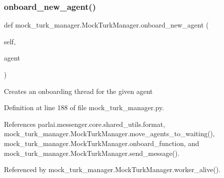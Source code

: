 \mbox{\label{classmock__turk__manager_1_1MockTurkManager_aa71ab452422b7871d2fc2ae2b2b8af0d}} 
\subsubsection{\texorpdfstring{onboard\+\_\+new\+\_\+agent()}{onboard\_new\_agent()}}
{\footnotesize\ttfamily def mock\+\_\+turk\+\_\+manager.\+Mock\+Turk\+Manager.\+onboard\+\_\+new\+\_\+agent (\begin{DoxyParamCaption}\item[{}]{self,  }\item[{}]{agent }\end{DoxyParamCaption})}

\begin{DoxyVerb}Creates an onboarding thread for the given agent\end{DoxyVerb}
 

Definition at line 188 of file mock\+\_\+turk\+\_\+manager.\+py.



References parlai.\+messenger.\+core.\+shared\+\_\+utils.\+format, mock\+\_\+turk\+\_\+manager.\+Mock\+Turk\+Manager.\+move\+\_\+agents\+\_\+to\+\_\+waiting(), mock\+\_\+turk\+\_\+manager.\+Mock\+Turk\+Manager.\+onboard\+\_\+function, and mock\+\_\+turk\+\_\+manager.\+Mock\+Turk\+Manager.\+send\+\_\+message().



Referenced by mock\+\_\+turk\+\_\+manager.\+Mock\+Turk\+Manager.\+worker\+\_\+alive().

